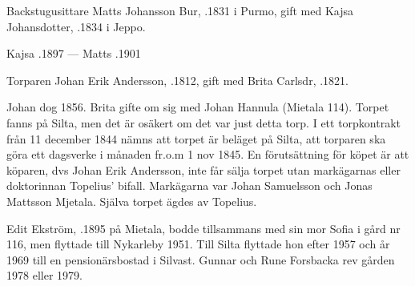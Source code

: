 Backstugusittare Matts Johansson Bur, .1831 i Purmo, gift med Kajsa Johansdotter, .1834 i Jeppo.
\begin{jhchildren}
  \item {}
  \item {}
  \item {}
  \item {}
  \item {}
\end{jhchildren}

Kajsa .1897  ---  Matts .1901


Torparen Johan Erik Andersson,  .1812, gift med Brita Carlsdr, .1821.
\begin{jhchildren}
  \item {}
  \item {}
  \item {}
\end{jhchildren}

Johan dog 1856. Brita gifte om sig med Johan Hannula (Mietala 114). Torpet fanns på Silta, men det är osäkert om det var just detta torp. I ett torpkontrakt från 11 december 1844 nämns att torpet är beläget på Silta, att torparen ska göra ett dagsverke i månaden fr.o.m 1 nov 1845. En förutsättning för köpet är att köparen, dvs Johan Erik Andersson, inte får sälja torpet utan markägarnas eller doktorinnan Topelius' bifall. Markägarna var Johan Samuelsson och Jonas Mattsson Mjetala. Själva torpet ägdes av Topelius.





Edit Ekström, .1895 på Mietala, bodde tillsammans med sin mor Sofia i gård nr 116, men flyttade till Nykarleby 1951. Till Silta flyttade hon efter 1957 och år 1969 till en pensionärsbostad i Silvast. Gunnar och Rune Forsbacka rev gården 1978 eller 1979.

